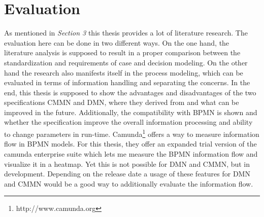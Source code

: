 \documentclass[11pt,a4paper,draft]{article}
\begin{document}
\section{Evaluation}
As mentioned in \textit{Section 3} this thesis provides a lot of literature research. The evaluation here can be done in two different ways. On the one hand, the literature analysis is supposed to result in a proper comparison between the standardization and requirements of case and decision modeling. On the other hand the research also manifests itself in the process modeling, which can be evaluated in terms of information handling and separating the concerns. In the end, this thesis is supposed to show the advantages and disadvantages of the two specifications CMMN and DMN, where they derived from and what can be improved in the future. Additionally, the compatibility with BPMN is shown and whether the specification improve the overall information processing and ability to change parameters in run-time. Camunda\footnote[2]{http://www.camunda.org} offers a way to measure information flow in BPMN models. For this thesis, they offer an expanded trial version of the camunda enterprise suite which lets me measure the BPMN information flow and visualize it in a heatmap. Yet this is not possible for DMN and CMMN, but in development. Depending on the release date a usage of these features for DMN and CMMN would be a good way to additionally evaluate the information flow. 



\end{document}
